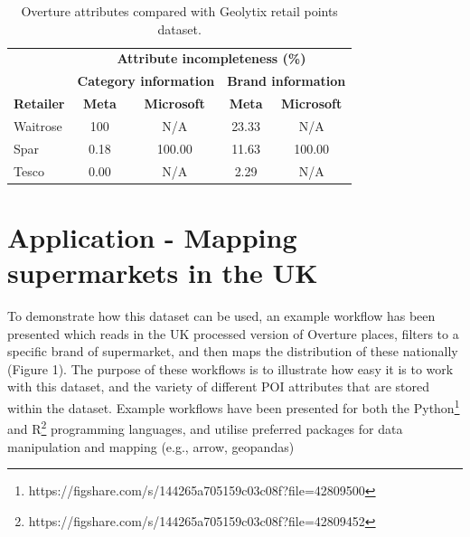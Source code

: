 \documentclass[
]{article}
\begin{document}
\def\arraystretch{1.5}
\begin{table}[]
\caption{\label{table2} Overture attributes compared with Geolytix retail points dataset.}
\centering
\bigskip
\begin{tabular}{lcccc}
\hline
\multirow{2}{*}{} & \multicolumn{4}{c}{\textbf{Attribute incompleteness (\%)}}                                                  \\ \cline{2-5} 
                  & \multicolumn{2}{c|}{\textbf{Category information}}                  & \multicolumn{2}{c}{\textbf{Brand information}} \\ \hline
\textbf{Retailer}          & \multicolumn{1}{|c}{\textbf{Meta}} & \multicolumn{1}{c|}{\textbf{Microsoft}} & \multicolumn{1}{c}{\textbf{Meta}}  & \textbf{Microsoft} \\ \hline
Waitrose          & \multicolumn{1}{|c}{100}  & \multicolumn{1}{c|}{N/A}       & \multicolumn{1}{c}{23.33} & N/A       \\
Spar              & \multicolumn{1}{|c}{0.18} & \multicolumn{1}{c|}{100.00}    & \multicolumn{1}{c}{11.63} & 100.00    \\
Tesco             & \multicolumn{1}{|c}{0.00} & \multicolumn{1}{c|}{N/A}       & \multicolumn{1}{c}{2.29}  & N/A       \\ \hline
\end{tabular}
\end{table}

\section{Application - Mapping supermarkets in the
UK}\label{application---mapping-supermarkets-in-the-uk}

To demonstrate how this dataset can be used, an example workflow has
been presented which reads in the UK processed version of Overture
places, filters to a specific brand of supermarket, and then maps the
distribution of these nationally (Figure 1). The purpose of these
workflows is to illustrate how easy it is to work with this dataset, and
the variety of different POI attributes that are stored within the
dataset. Example workflows have been presented for both the
Python\footnote{https://figshare.com/s/144265a705159c03c08f?file=42809500}
and R\footnote{https://figshare.com/s/144265a705159c03c08f?file=42809452}
programming languages, and utilise preferred packages for data
manipulation and mapping (e.g., arrow, geopandas)
\end{document}
